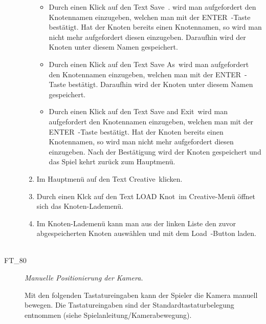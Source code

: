 \begin{description}
\begin{enumerate}
		\begin{itemize} 
		
        \item Durch einen Klick auf den Text \glqq Save\grqq~. wird man aufgefordert den Knotennamen einzugeben, welchen man mit der \glqq ENTER\grqq~-Taste bestätigt. Hat der Knoten bereits einen Knotennamen, so wird man nicht mehr aufgefordert diesen einzugeben. Daraufhin wird der Knoten unter diesem Namen gespeichert.
        
        \item Durch einen Klick auf den Text \glqq Save As\grqq~wird man aufgefordert den Knotennamen einzugeben, welchen man mit der \glqq ENTER\grqq~-Taste bestätigt. Daraufhin wird der Knoten unter diesem Namen gespeichert.
        
        \item Durch einen Klick auf den Text \glqq Save and Exit\grqq~wird man aufgefordert den Knotennamen einzugeben, welchen man mit der \glqq ENTER\grqq~-Taste bestätigt. Hat der Knoten bereits einen Knotennamen, so wird man nicht mehr aufgefordert diesen einzugeben. Nach der Bestätigung wird der Knoten gespeichert und das Spiel kehrt zurück zum Hauptmenü.	
		
		\end{itemize}
		
		\item Im Hauptmenü auf den Text \glqq Creative\grqq~klicken.
		
		\item Durch einen Klck auf den Text \glqq LOAD Knot\grqq~im Creative-Menü öffnet sich das Knoten-Lademenü.
		
		\item Im Knoten-Lademenü kann man aus der linken Liste den zuvor abgespeicherten Knoten auswählen und mit dem \glqq Load\grqq~-Button laden.
		~\\
		
	\end{enumerate}
	
	
	
	\item[FT\_80] \textit{Manuelle Positionierung der Kamera.} \hfill\\
	
	\label{FT:80}
	
	Mit den folgenden Tastatureingaben kann der Spieler die Kamera manuell bewegen. Die Tastatureingaben sind der Standardtastaturbelegung entnommen (siehe Spielanleitung/Kamerabewegung).
	

\end{description}
